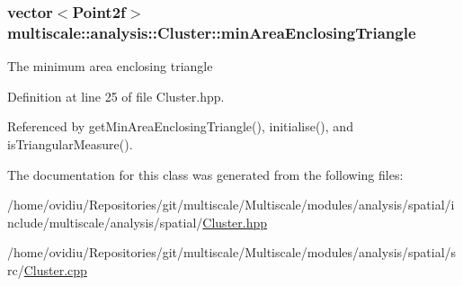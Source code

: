 \hypertarget{classmultiscale_1_1analysis_1_1Cluster_a7678d48581202c3ecc3f1283a1730dfa}{
\subsubsection[{min\-Area\-Enclosing\-Triangle}]{\setlength{\rightskip}{0pt plus 5cm}vector$<$Point2f$>$ multiscale\-::analysis\-::\-Cluster\-::min\-Area\-Enclosing\-Triangle\hspace{0.3cm}{\ttfamily [private]}}}\label{classmultiscale_1_1analysis_1_1Cluster_a7678d48581202c3ecc3f1283a1730dfa}
The minimum area enclosing triangle 

Definition at line 25 of file Cluster.\-hpp.



Referenced by get\-Min\-Area\-Enclosing\-Triangle(), initialise(), and is\-Triangular\-Measure().



The documentation for this class was generated from the following files\-:\begin{DoxyCompactItemize}
\item 
/home/ovidiu/\-Repositories/git/multiscale/\-Multiscale/modules/analysis/spatial/include/multiscale/analysis/spatial/\hyperlink{analysis_2spatial_2include_2multiscale_2analysis_2spatial_2Cluster_8hpp}{Cluster.\-hpp}\item 
/home/ovidiu/\-Repositories/git/multiscale/\-Multiscale/modules/analysis/spatial/src/\hyperlink{Cluster_8cpp}{Cluster.\-cpp}\end{DoxyCompactItemize}
